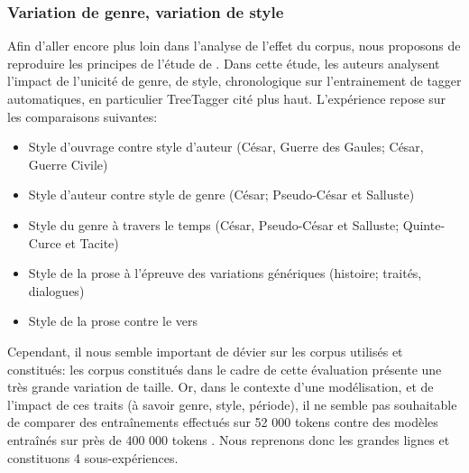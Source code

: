 \subsubsection{Variation de genre, variation de style}
\label{lemmatisation:extensibilite:prose-vers}

Afin d'aller encore plus loin dans l'analyse de l'effet du corpus, nous proposons de reproduire les principes de l'étude de \cite{poudat2009variations}. Dans cette étude, les auteurs analysent l'impact de l'unicité de genre, de style, chronologique sur l'entrainement de tagger automatiques, en particulier TreeTagger cité plus haut. L'expérience repose sur les comparaisons suivantes:
\begin{itemize}
    \item Style d'ouvrage contre style d'auteur (César, Guerre des Gaules; César, Guerre Civile)
    \item Style d'auteur contre style de genre (César; Pseudo-César et Salluste)
    \item Style du genre à travers le temps (César, Pseudo-César et Salluste; Quinte-Curce et Tacite)
    \item Style de la prose à l'épreuve des variations génériques (histoire; traités, dialogues)
    \item Style de la prose contre le vers
\end{itemize}{}

Cependant, il nous semble important de dévier sur les corpus utilisés et constitués: les corpus constitués dans le cadre de cette évaluation présente une très grande variation de taille. Or, dans le contexte d'une modélisation, et de l'impact de ces traits (à savoir genre, style, période), il ne semble pas souhaitable de comparer des entraînements effectués sur 52 000 tokens contre des modèles entraînés sur près de 400 000 tokens \cite[par exemple][p.~135, 2.~2.~4]{poudat2009variations}. Nous reprenons donc les grandes lignes et constituons 4 sous-expériences.

